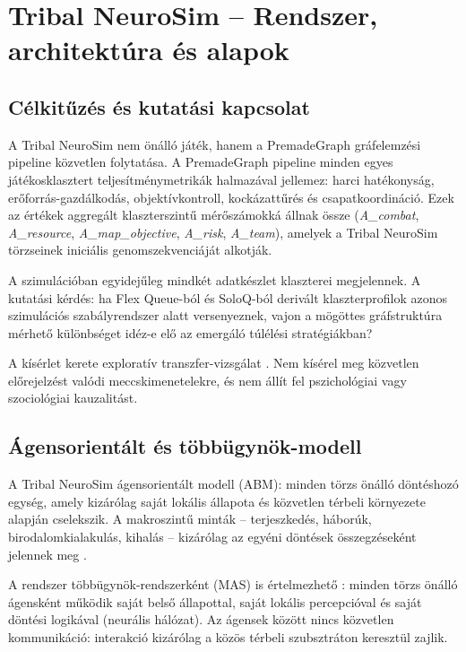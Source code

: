\chapter{Tribal NeuroSim -- Rendszer, architektúra és alapok}

\section{Célkitűzés és kutatási kapcsolat}

A Tribal NeuroSim nem önálló játék, hanem a PremadeGraph gráfelemzési pipeline közvetlen folytatása. A PremadeGraph pipeline minden egyes játékosklasztert teljesítménymetrikák halmazával jellemez: harci hatékonyság, erőforrás-gazdálkodás, objektívkontroll, kockázattűrés és csapatkoordináció. Ezek az értékek aggregált klaszterszintű mérőszámokká állnak össze (\textit{A\_combat}, \textit{A\_resource}, \textit{A\_map\_objective}, \textit{A\_risk}, \textit{A\_team}), amelyek a Tribal NeuroSim törzseinek iniciális genomszekvenciáját alkotják.

A szimulációban egyidejűleg mindkét adatkészlet klaszterei megjelennek. A kutatási kérdés: ha Flex Queue-ból és SoloQ-ból derivált klaszterprofilok azonos szimulációs szabályrendszer alatt versenyeznek, vajon a mögöttes gráfstruktúra mérhető különbséget idéz-e elő az emergáló túlélési stratégiákban?

A kísérlet kerete exploratív transzfer-vizsgálat \cite{bonabeau2002}. Nem kísérel meg közvetlen előrejelzést valódi meccskimenetelekre, és nem állít fel pszichológiai vagy szociológiai kauzalitást.

\section{Ágensorientált és többügynök-modell}

A Tribal NeuroSim ágensorientált modell (ABM): minden törzs önálló döntéshozó egység, amely kizárólag saját lokális állapota és közvetlen térbeli környezete alapján cselekszik. A makroszintű minták -- terjeszkedés, háborúk, birodalomkialakulás, kihalás -- kizárólag az egyéni döntések összegzéseként jelennek meg \cite{bonabeau2002}.

A rendszer többügynök-rendszerként (MAS) is értelmezhető \cite{wooldridgejennings1995}: minden törzs önálló ágensként működik saját belső állapottal, saját lokális percepcióval és saját döntési logikával (neurális hálózat). Az ágensek között nincs közvetlen kommunikáció: interakció kizárólag a közös térbeli szubsztráton keresztül zajlik.

